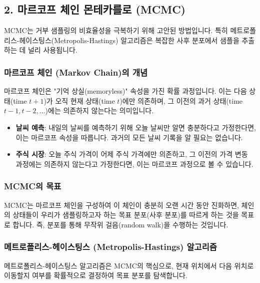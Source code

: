 \documentclass[11pt,a4paper]{article}
\theoremstyle{definition}
\begin{document}
\subsection*{2. 마르코프 체인 몬테카를로 (MCMC)}
MCMC는 거부 샘플링의 비효율성을 극복하기 위해 고안된 방법입니다. 특히 메트로폴리스-헤이스팅스(Metropolis-Hastings) 알고리즘은 복잡한 사후 분포에서 샘플을 추출하는 데 널리 사용됩니다.

\subsubsection*{마르코프 체인 (Markov Chain)의 개념}
\begin{infobox}[title=마르코프 속성 (Markovian Property): 기억 상실]
마르코프 체인은 "기억 상실(memoryless)" 속성을 가진 확률 과정입니다. 이는 다음 상태(time $t+1$)가 오직 현재 상태(time $t$)에만 의존하며, 그 이전의 과거 상태(time $t-1, t-2, \dots$)에는 의존하지 않는다는 의미입니다.
\end{infobox}

\begin{examplebox}[title=마르코프 속성 비유]
\begin{itemize}
    \item \textbf{날씨 예측}: 내일의 날씨를 예측하기 위해 오늘 날씨만 알면 충분하다고 가정한다면, 이는 마르코프 속성을 따릅니다. 과거의 모든 날씨 기록을 알 필요는 없습니다.
    \item \textbf{주식 시장}: 오늘 주식 가격이 어제 주식 가격에만 의존하고, 그 이전의 가격 변동 과정에는 의존하지 않는다고 가정한다면, 이는 마르코프 과정으로 볼 수 있습니다.
\end{itemize}
\end{examplebox}

\subsubsection*{MCMC의 목표}
MCMC는 마르코프 체인을 구성하여 이 체인이 충분히 오랜 시간 동안 진화하면, 체인의 상태들이 우리가 샘플링하고자 하는 목표 분포(사후 분포)를 따르게 하는 것을 목표로 합니다. 즉, 분포를 통해 무작위 걸음(random walk)을 수행하는 것입니다.

\subsubsection*{메트로폴리스-헤이스팅스 (Metropolis-Hastings) 알고리즘}
메트로폴리스-헤이스팅스 알고리즘은 MCMC의 핵심으로, 현재 위치에서 다음 위치로 이동할지 여부를 확률적으로 결정하여 목표 분포를 탐색합니다.
\end{document}

